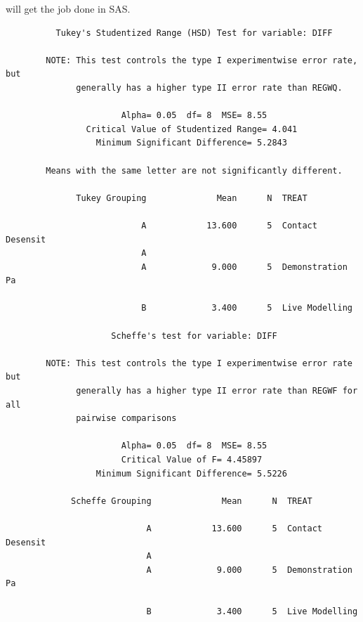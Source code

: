 will get the job done in SAS.
\begin{large}
\begin{verbatim}
          Tukey's Studentized Range (HSD) Test for variable: DIFF

        NOTE: This test controls the type I experimentwise error rate, but 
              generally has a higher type II error rate than REGWQ.

                       Alpha= 0.05  df= 8  MSE= 8.55
                Critical Value of Studentized Range= 4.041
                  Minimum Significant Difference= 5.2843

        Means with the same letter are not significantly different.

              Tukey Grouping              Mean      N  TREAT
                                   
                           A            13.600      5  Contact Desensit
                           A       
                           A             9.000      5  Demonstration Pa
                                   
                           B             3.400      5  Live Modelling

                     Scheffe's test for variable: DIFF

        NOTE: This test controls the type I experimentwise error rate but 
              generally has a higher type II error rate than REGWF for all 
              pairwise comparisons

                       Alpha= 0.05  df= 8  MSE= 8.55
                       Critical Value of F= 4.45897
                  Minimum Significant Difference= 5.5226

             Scheffe Grouping              Mean      N  TREAT
                                    
                            A            13.600      5  Contact Desensit
                            A       
                            A             9.000      5  Demonstration Pa
                                    
                            B             3.400      5  Live Modelling

\end{verbatim}
\end{large}
\newpage
{}
